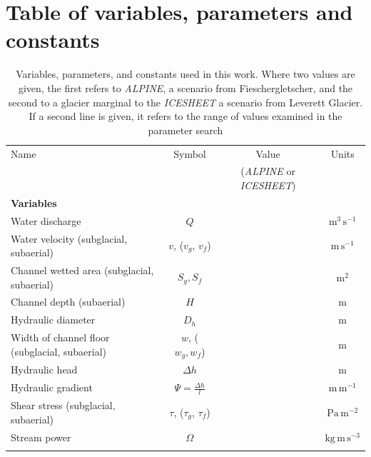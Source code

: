 \documentclass[draft]{agujournal2019}
\newcommand{\alpine}{\textit{ALPINE}}
\newcommand{\icesheet}{\textit{ICESHEET}}
\begin{document}
\section{Table of variables, parameters and constants}
\begin{table}[h]
  \centering
  \caption{Variables, parameters, and constants used in this work.
    Where two values are given, the first refers to  \alpine{}, a scenario from Fieschergletscher, and the second to a glacier marginal to the \icesheet{} a scenario from Leverett Glacier. If a second line is given, it refers to the range of values examined in the parameter search}
  \small %
  \begin{tabular}{ l  c  c c }
    Name &Symbol&  Value&Units \\
    && (\alpine{} or \icesheet{})\\
    \hline
    \textbf{Variables}  & & & \\
    Water discharge  & $Q$& & $\mathrm{m^{3}\,s^{-1}}$ \\
    Water velocity (subglacial, subaerial)  & $v$, ($v_g,\,v_{f}$)& & $\mathrm{m\,s^{-1}}$ \\
    Channel wetted area (subglacial, subaerial) &  $S_g, S_f$& & $\mathrm{m^2}$     \\
    Channel depth (subaerial) & $H$&& $\mathrm{m}$\\
    Hydraulic diameter &$D_h$&&$\mathrm{m}$\\
    Width of channel floor (subglacial, subaerial) & $w$, ($w_g,w_f$)&  & $\mathrm{m}$     \\
    Hydraulic head &$\Delta h$&& $\mathrm{m}$\\
    Hydraulic gradient &$\Psi=\frac{\Delta h}{l}$&& $\mathrm{m\, m^{-1}}$\\
    Shear stress (subglacial, subaerial) & $\tau$, ($\tau_g,\,\tau_f$) && $\mathrm{Pa \, m^{-2}}$ \\
    Stream power & $\Omega$ && $\mathrm{ kg \, m\, s^{-3}}$ \\

         &&&\\


\end{tabular}
\end{table}
\end{document}
